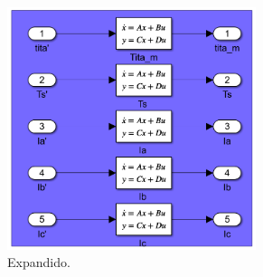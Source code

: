 \documentclass{article}
\begin{document}
\begin{figure}[H]
    \begin{subfigure}[b]{0.75\textwidth}
        \centering
        \includegraphics[width=0.8\textwidth]{sensores_no_ideales.png}
        \caption{Expandido.}
    \end{subfigure}
    \begin{subfigure}[b]{0.24\textwidth}
        \centering

\end{subfigure}
\end{figure}
\end{document}
